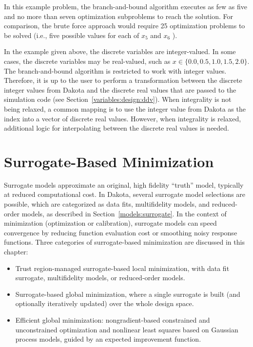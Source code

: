 In this example problem, the branch-and-bound algorithm executes as
few as five and no more than seven optimization subproblems to reach
the solution. For comparison, the brute force approach would require
25 optimization problems to be solved (i.e., five possible values for
each of $x_{5}$ and $x_{6}$ ).

In the example given above, the discrete variables are integer-valued.
In some cases, the discrete variables may be real-valued, such as $x
\in \{0.0,0.5,1.0,1.5,2.0\}$.  The branch-and-bound algorithm is
restricted to work with integer values. Therefore, it is up to the
user to perform a transformation between the discrete integer values
from Dakota and the discrete real values that are passed to the
simulation code (see Section~\ref{variables:design:ddv}).  When
integrality is not being relaxed, a common mapping is to use the
integer value from Dakota as the index into a vector of discrete real
values.  However, when integrality is relaxed, additional logic for
interpolating between the discrete real values is needed.

\section{Surrogate-Based Minimization}\label{adv_meth:sbm}

Surrogate models approximate an original, high fidelity ``truth''
model, typically at reduced computational cost.  In Dakota, several
surrogate model selections are possible, which are categorized as data
fits, multifidelity models, and reduced-order models, as described in
Section~\ref{models:surrogate}.  In the context of minimization
(optimization or calibration), surrogate models can speed convergence
by reducing function evaluation cost or smoothing noisy response
functions.  Three categories of surrogate-based minimization are
discussed in this chapter:
\begin{itemize}
\item Trust region-managed surrogate-based local minimization, with
  data fit surrogate, multifidelity models, or reduced-order models.

\item Surrogate-based global minimization, where a single surrogate is
  built (and optionally iteratively updated) over the whole design
  space.

\item Efficient global minimization: nongradient-based constrained and
  unconstrained optimization and nonlinear least squares based on
  Gaussian process models, guided by an expected improvement function.
\end{itemize}

